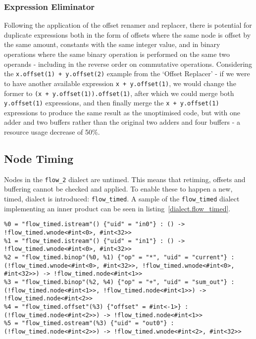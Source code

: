 \subsubsection{Expression Eliminator}
Following the application of the offset renamer and replacer, there is potential for duplicate expressions both in the form of offsets where the same node is offset by the same amount, constants with the same integer value, and in binary operations where the same binary operation is performed on the same two operands \hyphen{} including in the reverse order on commutative operations. Considering the \lstinline|x.offset(1) + y.offset(2)| example from the `Offset Replacer' \hyphen{} if we were to have another available expression \lstinline|x + y.offset(1)|, we would change the former to \lstinline|(x + y.offset(1)).offset(1)|, after which we could merge both \lstinline|y.offset(1)| expressions, and then finally merge the \lstinline|x + y.offset(1)| expressions to produce the same result as the unoptimised code, but with one adder and two buffers rather than the original two adders and four buffers \hyphen{} a resource usage decrease of 50\%.

\subsection{Node Timing}
Nodes in the \lstinline|flow_2| dialect are untimed. This means that retiming, offsets and buffering cannot be checked and applied. To enable these to happen a new, timed, dialect is introduced: \lstinline|flow_timed|. A sample of the \lstinline|flow_timed| dialect implementing an inner product can be seen in listing \ref{dialect.flow_timed}.

\renewcommand\theFancyVerbLine{\arabic{FancyVerbLine}}
\makeatletter
{}
\def\dontdofcolorbox{\renewcommand\fcolorbox[4][]{##4}}
\makeatother
\begin{listing}[H]
  \begin{verbatim}
%0 = "flow_timed.istream"() {"uid" = "in0"} : () -> !flow_timed.wnode<#int<0>, #int<32>>
%1 = "flow_timed.istream"() {"uid" = "in1"} : () -> !flow_timed.wnode<#int<0>, #int<32>>
%2 = "flow_timed.binop"(%0, %1) {"op" = "*", "uid" = "current"} : (!flow_timed.wnode<#int<0>, #int<32>>, !flow_timed.wnode<#int<0>, #int<32>>) -> !flow_timed.node<#int<1>>
%3 = "flow_timed.binop"(%2, %4) {"op" = "+", "uid" = "sum_out"} : (!flow_timed.node<#int<1>>, !flow_timed.node<#int<1>>) -> !flow_timed.node<#int<2>>
%4 = "flow_timed.offset"(%3) {"offset" = #int<-1>} : (!flow_timed.node<#int<2>>) -> !flow_timed.node<#int<1>>
%5 = "flow_timed.ostream"(%3) {"uid" = "out0"} : (!flow_timed.node<#int<2>>) -> !flow_timed.wnode<#int<2>, #int<32>>  
  \end{verbatim}
  \cprotect\caption{An implementation of an inner product in the \lstinline|flow_timed| dialect}\label{dialect.flow_timed}
\end{listing}

